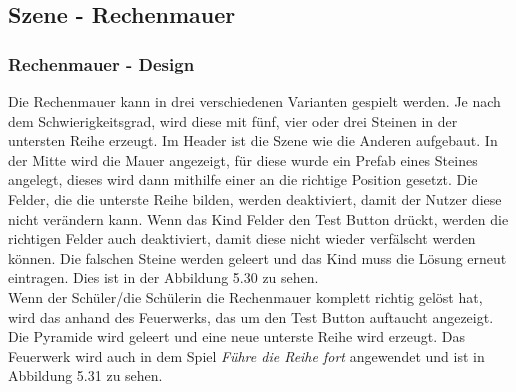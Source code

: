 \subsection{Szene - Rechenmauer}
\subsubsection{Rechenmauer - Design}
Die Rechenmauer kann in drei verschiedenen Varianten gespielt werden. Je nach dem Schwierigkeitsgrad, wird diese mit fünf, vier oder drei Steinen in der untersten Reihe erzeugt. Im Header ist die Szene wie die Anderen aufgebaut. In der Mitte wird die Mauer angezeigt, für diese wurde ein Prefab eines Steines angelegt, dieses wird dann mithilfe einer  an die richtige Position gesetzt. Die Felder, die die unterste Reihe bilden, werden deaktiviert, damit der Nutzer diese nicht verändern kann. Wenn das Kind Felder den Test Button drückt, werden die richtigen Felder auch deaktiviert, damit diese nicht wieder verfälscht werden können. Die falschen Steine werden geleert und das Kind muss die Lösung erneut eintragen. Dies ist in der Abbildung 5.30 zu sehen.\\
Wenn der Schüler/die Schülerin die Rechenmauer komplett richtig gelöst hat, wird das anhand des Feuerwerks, das um den Test Button auftaucht angezeigt. Die Pyramide wird geleert und eine neue unterste Reihe wird erzeugt. Das Feuerwerk wird auch in dem Spiel \textit{Führe die Reihe fort} angewendet und ist in Abbildung 5.31 zu sehen.
